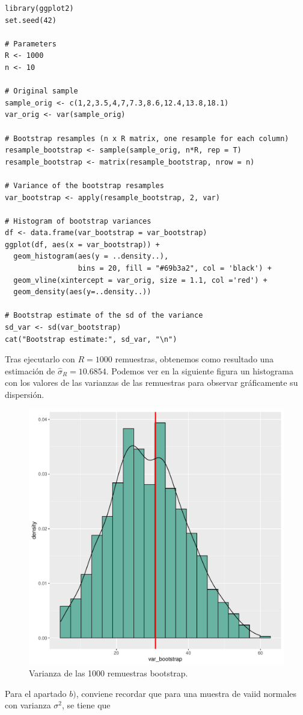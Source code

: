 \documentclass[12pt]{article}
\begin{document}
\begin{verbatim}
library(ggplot2)
set.seed(42)

# Parameters
R <- 1000
n <- 10

# Original sample
sample_orig <- c(1,2,3.5,4,7,7.3,8.6,12.4,13.8,18.1)
var_orig <- var(sample_orig)

# Bootstrap resamples (n x R matrix, one resample for each column)
resample_bootstrap <- sample(sample_orig, n*R, rep = T)
resample_bootstrap <- matrix(resample_bootstrap, nrow = n)

# Variance of the bootstrap resamples
var_bootstrap <- apply(resample_bootstrap, 2, var)

# Histogram of bootstrap variances
df <- data.frame(var_bootstrap = var_bootstrap)
ggplot(df, aes(x = var_bootstrap)) +
  geom_histogram(aes(y = ..density..),
                 bins = 20, fill = "#69b3a2", col = 'black') +
  geom_vline(xintercept = var_orig, size = 1.1, col ='red') +
  geom_density(aes(y=..density..))

# Bootstrap estimate of the sd of the variance
sd_var <- sd(var_bootstrap)
cat("Bootstrap estimate:", sd_var, "\n")
\end{verbatim}

Tras ejecutarlo con $R=1000$ remuestras, obtenemos como resultado una estimación de $\hat\sigma_R=10.6854$. Podemos ver en la siguiente figura un histograma con los valores de las varianzas de las remuestras para observar gráficamente su dispersión.

\begin{figure}[h!]
  \centering
  \includegraphics[width=0.5\linewidth]{img/fig5}
  \caption{Varianza de las 1000 remuestras bootstrap.}
\end{figure}

Para el apartado $b)$, conviene recordar que para una muestra de vaiid normales con varianza $\sigma^2$, se tiene que
\end{document}

